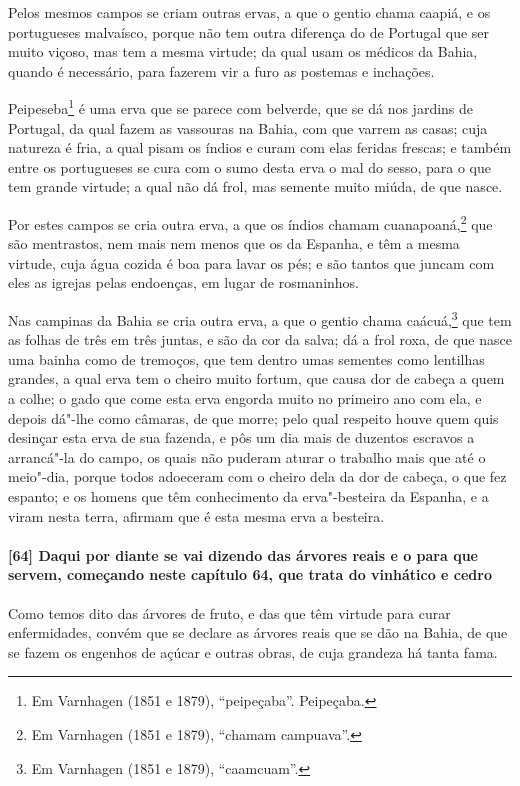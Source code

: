 Pelos mesmos campos se criam outras ervas, a que o gentio chama caapiá, e os portugueses
malvaísco, porque não tem outra diferença do de Portugal que ser muito viçoso, mas tem a
mesma virtude; da qual usam os médicos da Bahia, quando é necessário, para fazerem vir a
furo as postemas e inchações.

Peipeseba\footnote{ Em Varnhagen (1851 e 1879), ``peipeçaba''. Peipeçaba.} é uma erva que
se parece com belverde, que se dá nos jardins de Portugal, da qual fazem as vassouras na
Bahia, com que varrem as casas; cuja natureza é fria, a qual pisam os índios e curam com
elas feridas frescas; e também entre os portugueses se cura com o sumo desta erva o mal do
sesso, para o que tem grande virtude; a qual não dá frol, mas semente muito miúda, de que
nasce.

Por estes campos se cria outra erva, a que os índios chamam cuanapoaná,\footnote{ Em
Varnhagen (1851 e 1879), ``chamam campuava''.} que são mentrastos, nem mais nem menos que
os da Espanha, e têm a mesma virtude, cuja água cozida é boa para lavar os pés; e são
tantos que juncam com eles as igrejas pelas endoenças, em lugar de rosmaninhos.

Nas campinas da Bahia se cria outra erva, a que o gentio chama caácuá,\footnote{ Em
Varnhagen (1851 e 1879), ``caamcuam''.} que tem as folhas de três em três juntas, e são da
cor da salva; dá a frol roxa, de que nasce uma bainha como de tremoços, que tem dentro
umas sementes como lentilhas grandes, a qual erva tem o cheiro muito fortum, que causa dor
de cabeça a quem a colhe; o gado que come esta erva engorda muito no primeiro ano com ela,
e depois dá"-lhe como câmaras, de que morre; pelo qual respeito houve quem quis desinçar
esta erva de sua fazenda, e pôs um dia mais de duzentos escravos a arrancá"-la do campo, os
quais não puderam aturar o trabalho mais que até o meio"-dia, porque todos adoeceram com o
cheiro dela da dor de cabeça, o que fez espanto; e os homens que têm conhecimento da
erva"-besteira da Espanha, e a viram nesta terra, afirmam que é esta mesma erva a besteira.

\paragraph{[64] Daqui por diante se vai dizendo das árvores reais e o para que servem,
começando neste capítulo 64, que trata do vinhático e cedro}\quad
Como temos dito das árvores de fruto, e das que têm virtude para curar enfermidades,
convém que se declare as árvores reais que se dão na Bahia, de que se fazem os engenhos de
açúcar e outras obras, de cuja grandeza há tanta fama.

